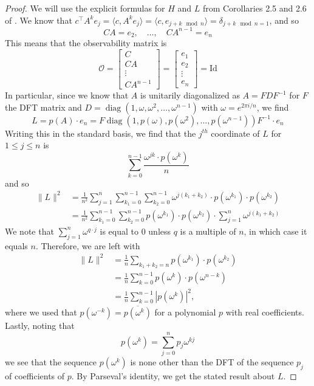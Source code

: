 \documentclass[11pt]{article}
\newcommand{\evannote}[1]{\textcolor{red}{\{evan: #1\}}}
\numberwithin{equation}{section}
\begin{document}
\begin{proof}
We will use the explicit formulas for $H$ and $L$ from Corollaries 2.5 and 2.6 of \cite{Mehrmann1996}.
    We know that $c^\top A^k e_j = \langle c, A^k e_j\rangle = \langle c, e_{j+k \mod n}\rangle = \delta_{j+k\mod n = 1}$, and so 
    $$CA = e_{2}, \quad \ldots, \quad CA^{n-1} =e_{n}$$
    This means that the observability matrix is 
    $$\mathcal{O} = \begin{bmatrix}
        C \\ CA \\ \vdots \\ CA^{n-1}
    \end{bmatrix} = \begin{bmatrix}
        e_1 \\ e_2 \\ \vdots \\ e_n
    \end{bmatrix} = \mathrm{Id}$$
In particular, since we know that $A$ is unitarily diagonalized as $A = FDF^{-1}$ for $F$ the DFT matrix and $D = \operatorname{diag}(1, \omega, \omega^2, \ldots, \omega^{n-1})$ with $\omega = e^{2\pi i / n}$, we find 
$$L = p(A) \cdot e_n = F \operatorname{diag}(1, p(\omega), p(\omega^2), \ldots, p(\omega^{n-1})) F^{-1} \cdot e_n$$
Writing this in the standard basis, we find that the $j^{th}$ coordinate of $L$ for $1 \leq j \leq n$ is
$$\sum_{k =0}^{n-1} \frac{\omega^{jk} \cdot p(\omega^k)}{n} $$
and so
\begin{align*}\|L\|^2 &= \frac{1}{n^2}\sum_{j = 1}^n \sum_{k_1 = 0}^{n-1} \sum_{k_2 = 0}^{n-1} {\omega^{j(k_1 + k_2)} \cdot p(\omega^{k_1}) \cdot p(\omega^{k_2})} 
\\ &= \frac{1}{n^2} \sum_{k_1 = 0}^{n-1} \sum_{k_2 = 0}^{n-1} {p(\omega^{k_1}) \cdot p(\omega^{k_2})} \cdot \sum_{j = 1}^n \omega^{j(k_1 + k_2)}
\end{align*}
We note that $\sum_{j=1}^n \omega^{q \cdot j}$ is equal to 0 unless $q$ is a multiple of $n$, in which case it equals $n$. Therefore, we are left with
\begin{align*}\|L\|^2 &= \frac{1}{n} \sum_{k_1 + k_2 = n} p(\omega^{k_1}) \cdot p({\omega^{k_2}}) \\&= \frac{1}{n}\sum_{k=0}^{n-1} p(\omega^k) \cdot p(\omega^{n-k})
\\&= \frac{1}{n} \sum_{k=0}^{n-1}|p(\omega^k)|^2,
\end{align*}
where we used that $p(\omega^{-k}) = \overline{p(\omega^k)}$ for a polynomial $p$ with real coefficients. Lastly, noting that
$$p(\omega^k) = \sum_{j=0}^n p_j \omega^{kj}$$
{we see that} the sequence $p(\omega^k)$ is none other than the DFT of the sequence $p_j$ of coefficients of $p$. By 
{Parseval's identity}, we get the stated result about $L$.


\end{proof}
\end{document}
